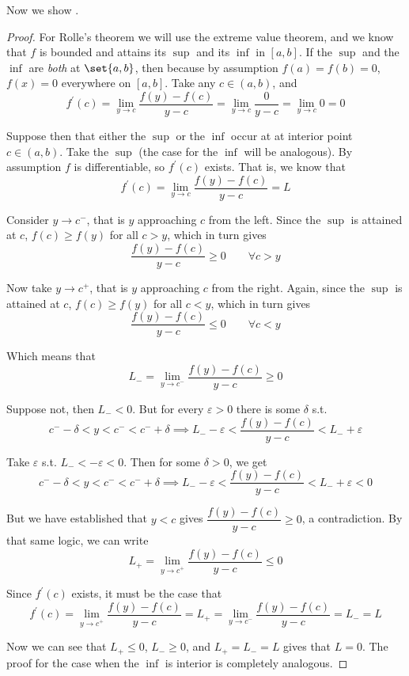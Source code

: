 \documentclass{article}
\begin{document}
Now we show .
\begin{proof}
    For Rolle's theorem we will use the extreme value theorem, and we know that $f$ is bounded and attains its $\sup$ and its $\inf$ in $[a, b]$. If the $\sup$ and the $\inf$ are \textit{both} at $\set{a, b}$, then because by assumption $f(a) = f(b) = 0$, $f(x) = 0$ everywhere on $[a, b]$. Take any $c \in (a, b)$, and
    \[
        f^\prime(c)
        = \lim_{y \to c} \dfrac{f(y) - f(c)}{y - c}
        = \lim_{y \to c} \dfrac{0}{y - c}
        = \lim_{y \to c} 0 = 0
    \]

    Suppose then that either the $\sup$ or the $\inf$ occur at at interior point $c \in (a, b)$. Take the $\sup$ (the case for the $\inf$ will be analogous). By assumption $f$ is differentiable, so $f^\prime(c)$ exists. That is, we know that
    \[
        f^\prime(c)
        = \lim_{y \to c} \dfrac{f(y) - f(c)}{y - c}
        = L
    \]

    Consider $y \to c^-$, that is $y$ approaching $c$ from the left. Since the $\sup$ is attained at $c$, $f(c) \ge f(y)$ for all $c > y$, which in turn gives
    \[
        \dfrac{f(y) - f(c)}{y - c} \ge 0
        \quad\quad
        \forall c > y
    \]

    Now take $y \to c^+$, that is $y$ approaching $c$ from the right. Again, since the $\sup$ is attained at $c$, $f(c) \ge f(y)$ for all $c < y$, which in turn gives
    \[
        \dfrac{f(y) - f(c)}{y - c} \le 0
        \quad\quad
        \forall c < y
    \]

    Which means that
    \[
        L_- = \lim_{y \to c^-} \dfrac{f(y) - f(c)}{y - c} \ge 0
    \]

    Suppose not, then $L_- < 0$. But for every $\varepsilon > 0$ there is some $\delta$ s.t.
    \[
        c^- - \delta < y < c^- < c^- + \delta
        \implies
        L_- - \varepsilon < \dfrac{f(y) - f(c)}{y - c} < L_- + \varepsilon
    \]

    Take $\varepsilon$ s.t. $L_- < - \varepsilon < 0$. Then for some $\delta > 0$, we get
    \[
        c^- - \delta < y < c^- < c^- + \delta
        \implies
        L_- - \varepsilon < \dfrac{f(y) - f(c)}{y - c} < L_- + \varepsilon < 0
    \]

    But we have established that $y < c$ gives $\dfrac{f(y) - f(c)}{y - c} \ge 0$, a contradiction. By that same logic, we can write
    \[
        L_+ = \lim_{y \to c^+} \dfrac{f(y) - f(c)}{y - c} \le 0
    \]

    Since $f^\prime(c)$ exists, it must be the case that
    \[
        f^\prime(c)
        = \lim_{y \to c^+} \dfrac{f(y) - f(c)}{y - c}
        = L_+
        = \lim_{y \to c^-} \dfrac{f(y) - f(c)}{y - c}
        = L_-
        = L
    \]

    Now we can see that $L_+ \le 0$, $L_- \ge 0$, and $L_+ = L_- = L$  gives that $L = 0$. The proof for the case when the $\inf$ is interior is completely analogous.
\end{proof}
\end{document}
